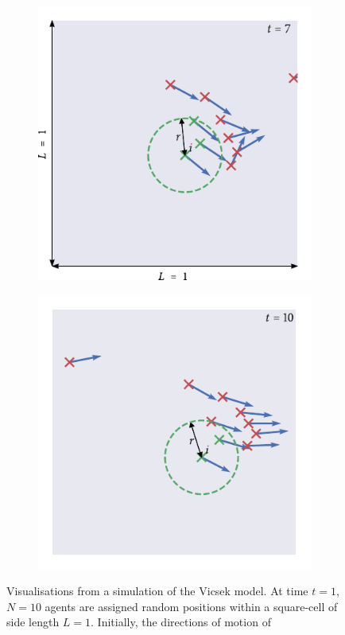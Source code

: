 \begin{figure}[tb]
\begin{subfigure}[b]{0.5\textwidth}
    \includegraphics{vicsek_simulation_7.pdf}
  \end{subfigure}%
  \begin{subfigure}[b]{0.5\textwidth}
    \includegraphics{vicsek_simulation_10.pdf}
  \end{subfigure}
  \caption{Visualisations from a simulation of the Vicsek model. At time
    $t=1$, $N=10$ agents are assigned random positions within a square-cell
    of side length $L=1$. Initially, the directions of motion of
}
\end{figure}
